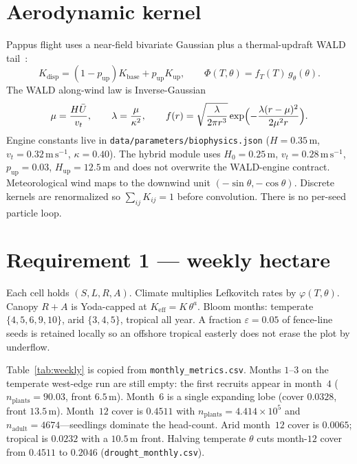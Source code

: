 \documentclass[12pt]{article}
\newcommand{\vt}{v_{t}}
\newcommand{\smi}{\theta}
\begin{document}
\section{Aerodynamic kernel}
Pappus flight uses a near-field bivariate Gaussian plus a thermal-updraft
WALD tail~\cite{katul2005}:
\begin{equation}
  K_{\mathrm{disp}}=(1-p_{\mathrm{up}})K_{\mathrm{base}}+p_{\mathrm{up}}K_{\mathrm{up}},
  \qquad
  \Phi(T,\theta)=f_T(T)\,g_\theta(\theta).
\end{equation}
The WALD along-wind law is Inverse-Gaussian
\begin{equation}
  \mu=\frac{H\bar U}{\vt},\qquad
  \lambda=\frac{\mu}{\kappa^{2}},\qquad
  f(r)=\sqrt{\frac{\lambda}{2\pi r^{3}}}
  \exp\Bigl(-\frac{\lambda(r-\mu)^{2}}{2\mu^{2} r}\Bigr).
\end{equation}
Engine constants live in \texttt{data/parameters/biophysics.json}
($H=0.35\,\mathrm{m}$, $\vt=0.32\,\mathrm{m\,s}^{-1}$, $\kappa=0.40$).
The hybrid module uses $H_0=0.25\,\mathrm{m}$, $\vt=0.28\,\mathrm{m\,s}^{-1}$,
$p_{\mathrm{up}}=0.03$, $H_{\mathrm{up}}=12.5\,\mathrm{m}$ and does not
overwrite the WALD-engine contract.
Meteorological wind maps to the downwind unit $(- \sin\theta,-\cos\theta)$.
Discrete kernels are renormalized so $\sum_{ij}K_{ij}=1$ before convolution.
There is no per-seed particle loop.

\section{Requirement 1 --- weekly hectare}
Each cell holds $(S,L,R,A)$. Climate multiplies Lefkovitch rates by
$\varphi(T,\smi)$. Canopy $R+A$ is Yoda-capped at
$K_{\mathrm{eff}}=K\,\smi^{a}$.
Bloom months: temperate $\{4,5,6,9,10\}$, arid $\{3,4,5\}$, tropical all year.
A fraction $\varepsilon=0.05$ of fence-line seeds is retained locally so an
offshore tropical easterly does not erase the plot by underflow.

Table~\ref{tab:weekly} is copied from \texttt{monthly\_metrics.csv}.
Months $1$--$3$ on the temperate west-edge run are still empty: the first
recruits appear in month~$4$ ($n_{\mathrm{plants}}=90.03$, front $6.5\,\mathrm{m}$).
Month~$6$ is a single expanding lobe (cover $0.0328$, front $13.5\,\mathrm{m}$).
Month~$12$ cover is $0.4511$ with $n_{\mathrm{plants}}=4.414\times 10^{5}$
and $n_{\mathrm{adult}}=4674$---seedlings dominate the head-count.
Arid month~$12$ cover is $0.0065$; tropical is $0.0232$ with a $10.5\,\mathrm{m}$
front. Halving temperate $\smi$ cuts month-$12$ cover from $0.4511$ to
$0.2046$ (\texttt{drought\_monthly.csv}).
\end{document}
